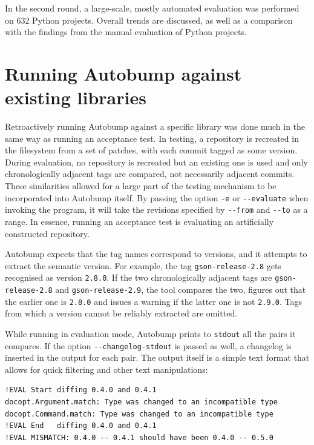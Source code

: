 \documentclass{l4proj}
\newcommand\genericstyle{\lstset{basicstyle=\ttm}}
\newcommand\codeinline[1]{{\genericstyle\lstinline!#1!}}
\begin{document}
In the second round, a large-scale, mostly automated evaluation was
performed on 632 Python projects. Overall trends are discussed, as
well as a comparison with the findings from the manual evaluation of
Python projects.

\section{Running Autobump against existing libraries}

Retroactively running Autobump against a specific library was done
much in the same way as running an acceptance test. In testing, a
repository is recreated in the filesystem from a set of patches, with
each commit tagged as some version. During evaluation, no repository
is recreated but an existing one is used and only chronologically
adjacent tags are compared, not necessarily adjacent commits. These
similarities allowed for a large part of the testing mechanism to be
incorporated into Autobump itself. By passing the option
\codeinline{-e} or \codeinline{--evaluate} when invoking the program,
it will take the revisions specified by \codeinline{--from} and
\codeinline{--to} as a range. In essence, running an acceptance test
is evaluating an artificially constructed repository.

Autobump expects that the tag names correspond to versions, and it
attempts to extract the semantic version. For example, the tag
\codeinline{gson-release-2.8} gets recognised as version
\codeinline{2.8.0}. If the two chronologically adjacent tags are
\codeinline{gson-release-2.8} and \codeinline{gson-release-2.9}, the
tool compares the two, figures out that the earlier one is
\codeinline{2.8.0} and issues a warning if the latter one is not
\codeinline{2.9.0}. Tags from which a version cannot be reliably
extracted are omitted.

While running in evaluation mode, Autobump prints to
\codeinline{stdout} all the pairs it compares. If the option
\codeinline{--changelog-stdout} is passed as well, a changelog is
inserted in the output for each pair. The output itself is a simple
text format that allows for quick filtering and other text
manipulations:

\begin{center}
\begin{BVerbatim}
!EVAL Start diffing 0.4.0 and 0.4.1
docopt.Argument.match: Type was changed to an incompatible type
docopt.Command.match: Type was changed to an incompatible type
!EVAL End   diffing 0.4.0 and 0.4.1
!EVAL MISMATCH: 0.4.0 -- 0.4.1 should have been 0.4.0 -- 0.5.0
\end{BVerbatim}
\end{center}
\end{document}
